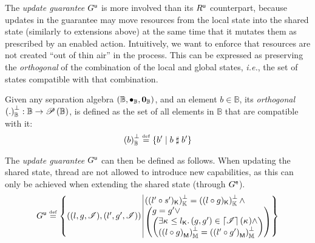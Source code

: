 The \emph{update guarantee} $G^{\textsf{u}}$ is more involved than its $R^{\textsf{u}}$ counterpart, because updates in the guarantee may move resources from the local state into the shared state (similarly to extensions above) at the same time that it mutates them as prescribed by an enabled action. Intuitively, we want to enforce that resources
are not created ``out of thin air'' in the process. This can be expressed as preserving the \emph{orthogonal} of the combination of the local and global states, \textit{i.e.}, the set of states compatible with that combination.
%
\begin{definition}[Orthogonal]\label{def:orthogonal}
Given any separation algebra $(\mathbb{B}, \bullet_{\mathbb{B}}, \mathbf{0}_{\mathbb{B}})$, and an element $b \in \mathbb{B}$, its \emph{orthogonal} $\left( .\right)_{\mathbb{B}}^{\bot} : \mathbb{B} \rightarrow \mathscr{P}\left(\mathbb{B} \right)$, is defined as the set of all elements in $\mathbb{B}$ that are compatible with it:
%
\[
	\left( b\right)_{\mathbb{B}}^{\bot} \mathrel{\stackrel{\smash{\scriptscriptstyle{\mathrm{def}}}}{=}} \left\{ b' \mid b \mathrel{\sharp} b' \right\}
\]
\end{definition}
%
The \emph{update guarantee} $G^{\textsf{u}}$ can then be defined as follows. When updating the shared state, thread are not allowed to introduce new capabilities, as this can only be achieved when extending the shared state (through $G^{\textsf{e}}$).
%
\[
	\updateG \eqdef
 	\left\{
	\begin{array}{@{} l @{\hspace*{2pt}} | @{\hspace*{2pt}} r @{}}
	  \left(
	     	(l, g, \lmod),
	     	(l', g', \lmod)
		\right)
  	&
  	\begin{array}{@{} l @{} }
  		\ortCap{\capPart{(l' \composeL s')}}  = \ortCap{\capPart{(l \composeL g)}} \land\\
	  	\left(
	  	\begin{array}{@{} l @{} }
	 		g = g' \lor\\
	 	  	\left(
	 	  	\begin{array}{@{} l @{}}
	 	  		\exsts{\ca{} \leq \capPart{l}}
	 	  		(g, g') \in \padAM{\lmod}(\ca{}) \land\\
	 	  	
	 	  	\ortH{\heapPart{\left(l \composeL g\right)}} = 
	 	  	\ortH{\heapPart{\left(l' \composeL g'\right)}}
	 	  	\end{array}	
	 	  	\right)
	 	\end{array}
   		\right)
   		\end{array}
 	\end{array}
	\right\}
\]
